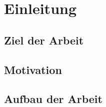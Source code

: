 \chapter{Einleitung}

\section{Ziel der Arbeit}

\section{Motivation} %
\begin{comment}
Bei der Entwicklung mobiler Anwendungen steht - besonders im Consumer-Bereich - neben vielen anderen Entscheidungen die Wahl der Ziel-Plattform an, wobei ein wichtiger Faktor sicher die Erreichbarkeit einer möglichst großen Nutzer-Anzahl darstellt.
Vermutlich um den  Entwicklungsaufwand nicht ins Bodenlose \todo{Stil!} ausufern zu lassen beschränken sich dabei viele App-Hersteller (oder -anbieter) auf die größten, meist genutzten Plattformen wie Android oder iOS. \todo{darf man so eine Behauptung jetzt einfach machen? oder wie weißt man sowas nach?}

Doch nicht nur, dass dadurch doppelter Wartungs- und Anpassungsaufwand für die Entwicklung entsteht, auch werden dadurch viele andere Betriebssysteme vernachlässigt, was letztlich zu Lasten der Nutzer geht, die auf einem vielfältigen aber auch diffundierten Markt - je nach Hersteller und Plattform - ein zum Teil eingeschränktes und ungleich verteiltes Angebot an Anwendungen vorfinden. 

Auf der anderen Seite hat der Bereich der Webentwicklung und -gestaltung in den letzten Jahren seit Aufkommen von Smartphones und Tablets eine neue Anforderung hinzu bekommen: Websites müssen nicht mehr nur für die unterschiedlichsten Browser auf dem Desktop angepasst werden, sondern sollen sich auch auf Geräten, die für Touch-Bedienung ausgelegt sind unterschiedlicher Bildschirmgrößen gleich gut anfühlen und bedienen lassen. Da der Trend für viele Firmen in Sachen Öffentlichkeitsarbeit, Kundenbindung und -freundlichkeit neben der Firmen-Website und der eigenen Facebook-Seite auch eine eigene App zu fordern scheint, liegt vor dem zuvor genannten Hintergrund der stark variierenden App-Formate der Ansatz nahe, auch den Webbrowser als eine weitere Plattform im bunten Gefüge aus Deployment-Anforderungen zu sehen, die nach Verminderung und Zusammenführung des Entwicklungsaufwands im mobilen Bereich verlangt. 

Letzterer Ansatz ist allerdings nur einer, den es zu Untersuchen gilt; Zentraler Forschungsgegenstand soll die Exploration der Möglichkeiten und Grenzen der plattformunabhängigen App-Entwicklung anhand eines beispielhaft implementierten Anwendungsfalls sein.
\end{comment}

\section{Aufbau der Arbeit} %
